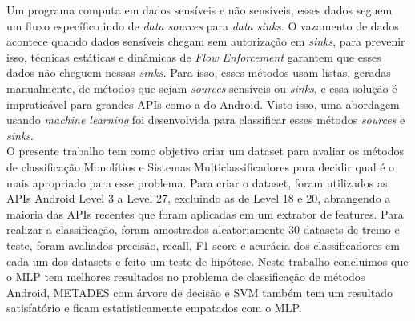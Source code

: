 Um programa computa em dados sensíveis e não sensíveis, esses dados seguem um fluxo específico indo de \textit{data sources} para \textit{data sinks}. O vazamento de dados acontece quando dados sensíveis chegam sem autorização em \textit{sinks}, para prevenir isso,  técnicas estáticas e dinâmicas de \textit{Flow Enforcement} garantem que esses dados não cheguem nessas \textit{sinks}. Para isso, esses métodos usam listas, geradas manualmente, de métodos que sejam \textit{sources} sensíveis ou \textit{sinks}, e essa solução é impraticável para grandes APIs como a do Android. Visto isso, uma abordagem usando \textit{machine learning} foi desenvolvida para classificar esses métodos \textit{sources} e \textit{sinks}. \\

O presente trabalho tem como objetivo criar um dataset para avaliar os métodos de classificação Monolítios e Sistemas Multiclassificadores para decidir qual é o mais apropriado para esse problema. Para criar o dataset, foram utilizados as APIs Android Level 3 a Level 27, excluindo as de Level 18 e 20, abrangendo a maioria das APIs recentes que foram aplicadas em um extrator de features. Para realizar a classificação, foram amostrados aleatoriamente 30 datasets de treino e teste, foram avaliados precisão, recall, F1 score e acurácia dos classificadores em cada um dos datasets e feito um teste de hipótese. Neste trabalho concluimos que o MLP tem melhores resultados no problema de classificação de métodos Android, METADES com árvore de decisão e SVM também tem um resultado satisfatório e ficam estatisticamente empatados com o MLP.
